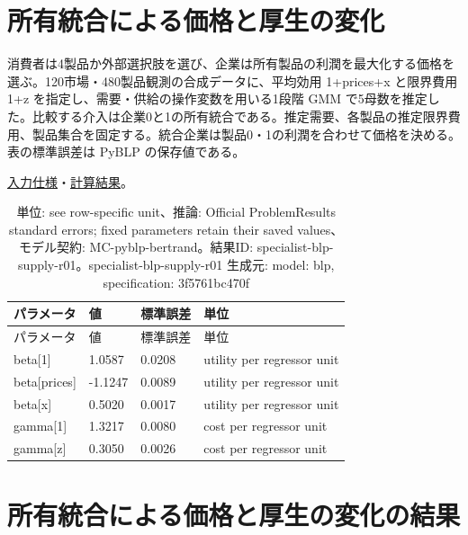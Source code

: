 \documentclass[ecta,nameyear,draft]{econsocart}
\begin{document}
\begin{minipage}{\linewidth}

\section{所有統合による価格と厚生の変化}\label{result-7}

消費者は4製品か外部選択肢を選び、企業は所有製品の利潤を最大化する価格を選ぶ。120市場・480製品観測の合成データに、平均効用
1+prices+x と限界費用 1+z を指定し、需要・供給の操作変数を用いる1段階
GMM
で5母数を推定した。比較する介入は企業0と1の所有統合である。推定需要、各製品の推定限界費用、製品集合を固定する。統合企業は製品0・1の利潤を合わせて価格を決める。表の標準誤差は
PyBLP の保存値である。

\href{https://github.com/yoshimurahiroki/econ-project-mini/blob/f9093ba87cabce7bee1fdf3391656544617a8cb9/examples/research-workspace/models/blp-supply-spec.json}{入力仕様}・\href{https://github.com/yoshimurahiroki/econ-project-mini/blob/f9093ba87cabce7bee1fdf3391656544617a8cb9/examples/research-workspace/models/blp-supply-result.json}{計算結果}。

\begin{longtable}[]{@{}llll@{}}
\caption{単位: see row-specific unit、推論: Official ProblemResults
standard errors; fixed parameters retain their saved values、モデル契約:
MC-pyblp-bertrand。結果ID:
specialist-blp-supply-r01。specialist-blp-supply-r01 生成元: model: blp,
specification: 3f5761bc470f}\tabularnewline
\toprule\noalign{}
パラメータ & 値 & 標準誤差 & 単位 \\
\midrule\noalign{}
\endfirsthead
\toprule\noalign{}
パラメータ & 値 & 標準誤差 & 単位 \\
\midrule\noalign{}
\endhead
\bottomrule\noalign{}
\endlastfoot
beta{[}1{]} & 1.0587 & 0.0208 & utility per regressor unit \\
beta{[}prices{]} & -1.1247 & 0.0089 & utility per regressor unit \\
beta{[}x{]} & 0.5020 & 0.0017 & utility per regressor unit \\
gamma{[}1{]} & 1.3217 & 0.0080 & cost per regressor unit \\
gamma{[}z{]} & 0.3050 & 0.0026 & cost per regressor unit \\
\end{longtable}

\end{minipage}

\section{所有統合による価格と厚生の変化の結果}\label{result-8}
\end{document}
